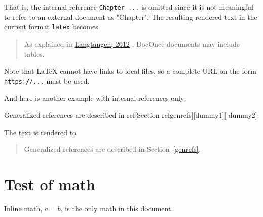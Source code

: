 \documentclass[%
oneside,                 %
final,                   %
chapterprefix=true,      %
open=right,              %
10pt]{book}
\makeatletter
\def\cleardoublepage{\clearpage\if@twoside \ifodd\c@page\else
\hbox{}
\thispagestyle{empty}
\newpage
\if@twocolumn\hbox{}\newpage\fi\fi\fi}
\newcommand{\clearemptydoublepage}{\clearpage{\pagestyle{empty}\cleardoublepage}}
\makeatother
\begin{document}
That is, the internal reference \texttt{Chapter ...} is omitted since
it is not meaningful to refer to an external document as "Chapter".
The resulting rendered text in the current format \texttt{latex} becomes


\begin{quote}
As explained in
\href{{https://hplgit.github.io/doconce/test/demo_testdoc.html}}{Langtangen, 2012}
\cite{testdoc:12}, DocOnce documents may include tables.
\end{quote}


Note that {\LaTeX} cannot
have links to local files, so a complete URL on the form
\texttt{https://...} must be used.

And here is another example with internal references only:




\bdat
Generalized references are described in ref[Section ref{genrefs}][dummy1][
dummy2].

\edat

The text is rendered to


\begin{quote}
Generalized references are described in
Section~\ref{genrefs}.
\end{quote}


\chapter{Test of math}


Inline math, $a=b$, is the only math in this document.

\clearemptydoublepage






\end{document}
